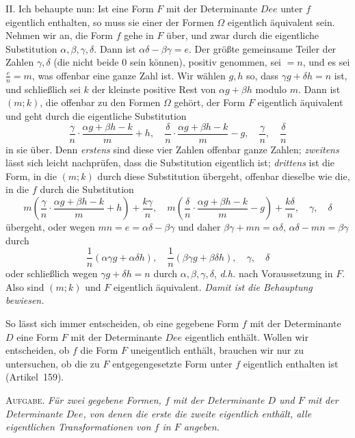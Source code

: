 II. Ich behaupte nun: Ist eine Form $F$ mit der Determinante $Dee$ unter $f$ eigentlich enthalten, so muss sie einer der Formen $\Omega$ eigentlich äquivalent sein. Nehmen wir an, die Form $f$ gehe in $F$ über, und zwar durch die eigentliche Substitution $\alpha,\beta,\gamma,\delta$. Dann ist $\alpha\delta-\beta\gamma=e$. Der größte gemeinsame Teiler der Zahlen $\gamma,\delta$ (die nicht beide 0 sein können), positiv genommen, sei $=n$, und es sei $\frac{e}{n}=m$, was offenbar eine ganze
Zahl ist. Wir wählen $g,h$ so, dass $\gamma g+\delta h=n$ ist, und schließlich sei $k$ der kleinste positive Rest von $\alpha g+\beta h$ modulo $m$. Dann ist $(m;k)$, die offenbar zu den Formen $\Omega$ gehört, der Form $F$ eigentlich äquivalent und geht durch die eigentliche Substitution
\[
\frac{\gamma}{n}\cdot\frac{\alpha g+\beta h-k}{m}+h,\quad
\frac{\delta}{n}\cdot\frac{\alpha g+\beta h-k}{m}-g,\quad
\frac{\gamma}{n},\quad\frac{\delta}{n}
\]
in sie über. Denn \textit{erstens} sind diese vier Zahlen offenbar ganze Zahlen; \textit{zweitens} lässt sich leicht nachprüfen, dass die Substitution eigentlich ist; \textit{drittens} ist die Form, in die $(m;k)$ durch diese Substitution übergeht, offenbar dieselbe wie die, in die $f$ durch die Substitution
\[
m\left(\frac{\gamma}{n}\cdot\frac{\alpha g+\beta h-k}{m}+h\right)+\frac{k\gamma}{n},\quad
m\left(\frac{\delta}{n}\cdot\frac{\alpha g+\beta h-k}{m}-g\right)+\frac{k\delta}{n},\quad\gamma,\quad\delta
\]
übergeht, oder wegen $mn=e=\alpha\delta-\beta\gamma$ und daher $\beta\gamma+mn=\alpha\delta$, $\alpha\delta-mn=\beta\gamma$ durch
\[
\frac{1}{n}(\alpha\gamma g+\alpha\delta h),\quad
\frac{1}{n}(\beta\gamma g+\beta\delta h),\quad\gamma,\quad\delta
\]
oder schließlich wegen $\gamma g+\delta h=n$ durch $\alpha,\beta,\gamma,\delta$, \textit{d.h.} nach Voraussetzung in $F$. Also sind $(m;k)$ und $F$ eigentlich äquivalent. \textit{Damit ist die Behauptung bewiesen.}

So lässt sich immer entscheiden, ob eine gegebene Form $f$ mit der Determinante $D$ eine Form $F$ mit der Determinante $Dee$ eigentlich enthält. Wollen wir entscheiden, ob $f$ die Form $F$ uneigentlich enthält, brauchen wir nur zu untersuchen, ob die zu $F$ entgegengesetzte Form unter $f$ eigentlich enthalten ist (Artikel~159).

\textsc{Aufgabe.} \textit{Für zwei gegebene Formen, $f$ mit der Determinante $D$ und $F$ mit der Determinante $Dee$, von denen die erste die zweite eigentlich enthält, alle eigentlichen Transformationen von $f$ in $F$ angeben.}

